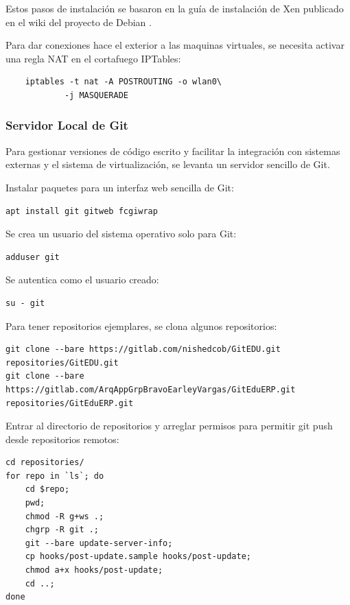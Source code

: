 Estos pasos de instalación se basaron en la guía de instalación de Xen publicado en el wiki del proyecto de Debian \citep{Debian-Wiki-Xen}.

Para dar conexiones hace el exterior a las maquinas virtuales, se necesita activar una regla NAT en el cortafuego IPTables:

\begin{lstlisting}
	iptables -t nat -A POSTROUTING -o wlan0\
    		-j MASQUERADE
\end{lstlisting}

 
\subsubsection{Servidor Local de Git}
Para gestionar versiones de código escrito y facilitar la integración con sistemas externas y el sistema de virtualización, se levanta un servidor sencillo de Git.

Instalar paquetes para un interfaz web sencilla de Git:
\begin{lstlisting}
apt install git gitweb fcgiwrap
\end{lstlisting}

Se crea un usuario del sistema operativo solo para Git:
\begin{lstlisting}
adduser git
\end{lstlisting}

Se autentica como el usuario creado:
\begin{lstlisting}
su - git
\end{lstlisting}

Para tener repositorios ejemplares, se clona algunos repositorios:
\begin{lstlisting}
git clone --bare https://gitlab.com/nishedcob/GitEDU.git repositories/GitEDU.git
git clone --bare https://gitlab.com/ArqAppGrpBravoEarleyVargas/GitEduERP.git repositories/GitEduERP.git
\end{lstlisting}

Entrar al directorio de repositorios y arreglar permisos para permitir git push desde repositorios remotos:
\begin{lstlisting}
cd repositories/
for repo in `ls`; do
	cd $repo;
    pwd;
    chmod -R g+ws .;
    chgrp -R git .;
    git --bare update-server-info;
    cp hooks/post-update.sample hooks/post-update;
    chmod a+x hooks/post-update;
    cd ..;
done
\end{lstlisting}

